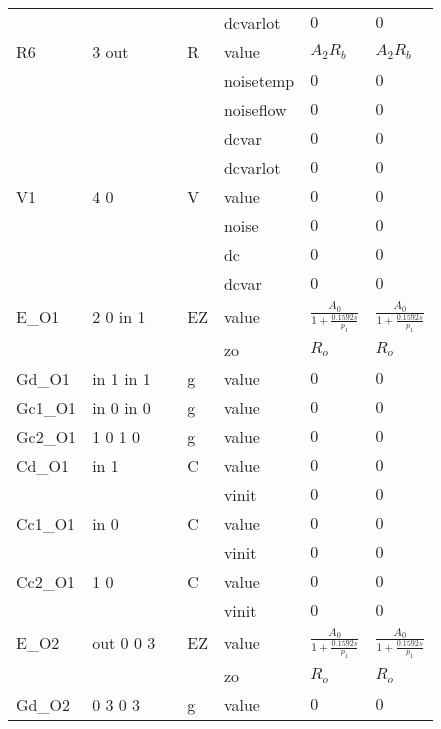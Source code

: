 \begin{table}[H]
\begin{tabular}[c]{lllllll}
\rowcolor{myyellow}
 & & & &\small{dcvarlot} &$0$ &$0$ \\ 
\small{R6} &\small{3 out } & &\small{R} &\small{value} &$A_{2} R_{b}$ &$A_{2} R_{b}$ \\ 
\rowcolor{myyellow}
 & & & &\small{noisetemp} &$0$ &$0$ \\ 
 & & & &\small{noiseflow} &$0$ &$0$ \\ 
\rowcolor{myyellow}
 & & & &\small{dcvar} &$0$ &$0$ \\ 
 & & & &\small{dcvarlot} &$0$ &$0$ \\ 
\rowcolor{myyellow}
\small{V1} &\small{4 0 } & &\small{V} &\small{value} &$0$ &$0$ \\ 
 & & & &\small{noise} &$0$ &$0$ \\ 
\rowcolor{myyellow}
 & & & &\small{dc} &$0$ &$0$ \\ 
 & & & &\small{dcvar} &$0$ &$0$ \\ 
\rowcolor{myyellow}
\small{E\_O1} &\small{2 0 in 1 } & &\small{EZ} &\small{value} &$\frac{A_{0}}{1 + \frac{0.1592 s}{p_{1}}}$ &$\frac{A_{0}}{1 + \frac{0.1592 s}{p_{1}}}$ \\ 
 & & & &\small{zo} &$R_{o}$ &$R_{o}$ \\ 
\rowcolor{myyellow}
\small{Gd\_O1} &\small{in 1 in 1 } & &\small{g} &\small{value} &$0$ &$0$ \\ 
\small{Gc1\_O1} &\small{in 0 in 0 } & &\small{g} &\small{value} &$0$ &$0$ \\ 
\rowcolor{myyellow}
\small{Gc2\_O1} &\small{1 0 1 0 } & &\small{g} &\small{value} &$0$ &$0$ \\ 
\small{Cd\_O1} &\small{in 1 } & &\small{C} &\small{value} &$0$ &$0$ \\ 
\rowcolor{myyellow}
 & & & &\small{vinit} &$0$ &$0$ \\ 
\small{Cc1\_O1} &\small{in 0 } & &\small{C} &\small{value} &$0$ &$0$ \\ 
\rowcolor{myyellow}
 & & & &\small{vinit} &$0$ &$0$ \\ 
\small{Cc2\_O1} &\small{1 0 } & &\small{C} &\small{value} &$0$ &$0$ \\ 
\rowcolor{myyellow}
 & & & &\small{vinit} &$0$ &$0$ \\ 
\small{E\_O2} &\small{out 0 0 3 } & &\small{EZ} &\small{value} &$\frac{A_{0}}{1 + \frac{0.1592 s}{p_{1}}}$ &$\frac{A_{0}}{1 + \frac{0.1592 s}{p_{1}}}$ \\ 
\rowcolor{myyellow}
 & & & &\small{zo} &$R_{o}$ &$R_{o}$ \\ 
\small{Gd\_O2} &\small{0 3 0 3 } & &\small{g} &\small{value} &$0$ &$0$ \\ 

\end{tabular}
\end{table}
